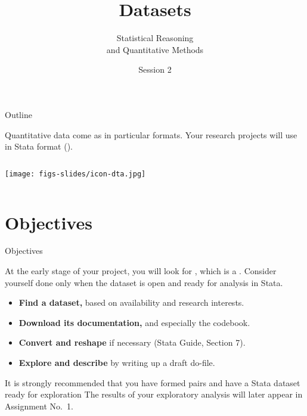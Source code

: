 \documentclass{beamer}
\author{Statistical Reasoning\\and Quantitative Methods}
\title{Datasets}
\institute{François Briatte \& Ivaylo Petev}
\date{Session 2}
\begin{document}
		
	\begin{frame}[t,plain]
		\titlepage
	\end{frame}
	
	\begin{frame}[t]{Outline}
	
	Quantitative data come as  in particular formats. Your research projects will use  in Stata format ().
	
		\begin{columns}[T]
			\tableofcontents[hideallsubsections]
			\begin{center}
				\texttt{[image: figs-slides/icon-dta.jpg]}
			\end{center}		
		\end{columns}
	\end{frame}
	

	\section{Objectives}

	\begin{frame}[t]{Objectives}

	At the early stage of your project, you will look for , which is a . Consider yourself done only when the dataset is open and ready for analysis in Stata.\vspace{1em}

		\begin{itemize}
			\item \textbf{Find a dataset,} based on availability and research interests.
			
			\item \textbf{Download its documentation,} and especially the codebook. 
			
			\item \textbf{Convert and reshape} if necessary (Stata Guide, Section 7).
			
			\item \textbf{Explore and describe} by writing up a draft do-file.
		\end{itemize}\vspace{1em}
	
	It is strongly recommended that you have formed pairs and have a Stata dataset ready for exploration  The results of your exploratory analysis will later appear in Assignment No.~1.
	
	\end{frame}
\end{document}
